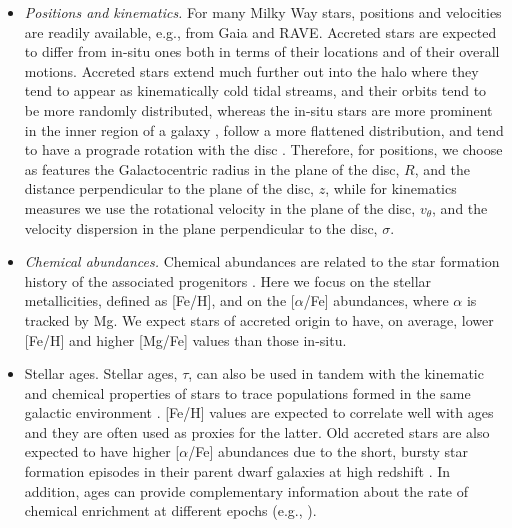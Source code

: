 \begin{itemize}

\item {\it Positions and kinematics.} For many Milky Way stars, positions and velocities are readily available, e.g., from Gaia and RAVE. Accreted stars are expected to differ from in-situ ones both in terms of their locations and of their overall motions. Accreted stars extend much further out into the halo where they tend to appear as kinematically cold tidal streams, and their orbits tend to be more randomly distributed, whereas the in-situ stars are more prominent in the inner region of a galaxy \citep{Font2011}, follow a more flattened distribution, and tend to have a prograde rotation with the disc \citep{McCarthy2012}. Therefore, for positions, we choose as features the Galactocentric radius in the plane of the disc, $R$,  and the distance perpendicular to the plane of the disc, $z$, while for kinematics measures we use the rotational velocity in the plane of the disc, $v_{\theta}$, and the velocity dispersion in the plane perpendicular to the disc, $\sigma$.

\item {\it Chemical abundances.} Chemical abundances are related to the star formation history of the associated progenitors \citep{Freeman2002}. Here we focus on the stellar metallicities, defined as [Fe/H], and on the [$\alpha$/Fe] abundances, where $\alpha$ is tracked by Mg. We expect stars of accreted origin to have, on average, lower [Fe/H] and higher [Mg/Fe] values than those in-situ.

\item{Stellar ages.}  Stellar ages, $\tau$, can also be used in tandem with the kinematic and chemical properties of stars to trace populations formed in the same galactic environment \citep{Helmi2020}. [Fe/H] values are expected to correlate well with ages and they are often used as proxies for the latter. Old accreted stars are also expected to have higher [$\alpha$/Fe] abundances due to the short, bursty star formation episodes in their parent dwarf galaxies at high redshift \citep{Robertson2005}. In addition, ages can provide complementary information about the rate of chemical enrichment at different epochs (e.g., \citealt{Hawkins2014}).


\end{itemize}
